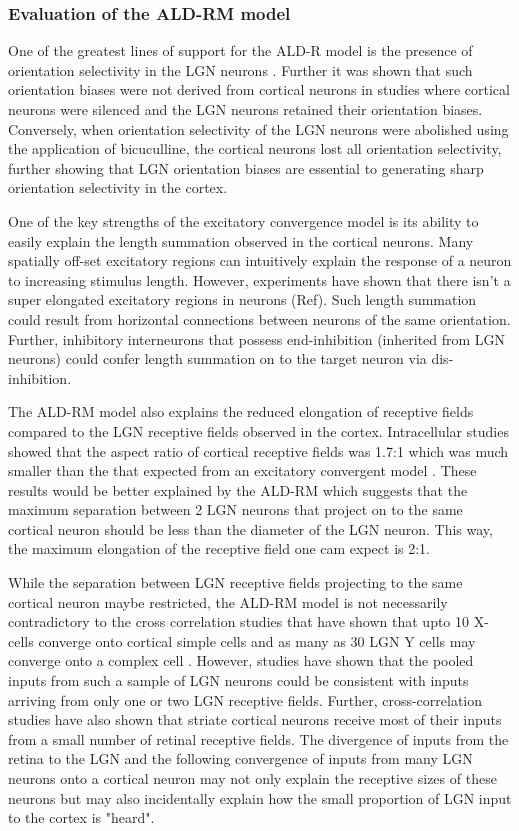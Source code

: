 \subsubsection{Evaluation of the ALD-RM model}

One of the greatest lines of support for the ALD-R model is the presence of orientation selectivity in the LGN neurons \cite{Vidyasagar1982}. Further it was shown that such orientation biases were not derived from cortical neurons in studies where cortical neurons were silenced and the LGN neurons retained their orientation biases. Conversely, when orientation selectivity of the LGN neurons were abolished using the application of bicuculline, the cortical neurons lost all orientation selectivity, further showing that LGN orientation biases are essential to generating sharp orientation selectivity in the cortex.

One of the key strengths of the excitatory convergence model is its ability to easily explain the length summation observed in the cortical neurons. Many spatially off-set excitatory regions can intuitively explain the response of a neuron to increasing stimulus length. However, experiments have shown that there isn't a super elongated excitatory regions in neurons (Ref). Such length summation could result from horizontal connections between neurons of the same orientation. Further, inhibitory interneurons that possess end-inhibition (inherited from LGN neurons) could confer length summation on to the target neuron via dis-inhibition.

The ALD-RM model also explains the reduced elongation of receptive fields compared to the LGN receptive fields observed in the cortex. Intracellular studies showed that the aspect ratio of cortical receptive fields was 1.7:1 which was much smaller than the that expected from an excitatory convergent model \cite{Pei1994}. These results would be better explained by the ALD-RM which suggests that the maximum separation between 2 LGN neurons that project on to the same cortical neuron should be less than the diameter of the LGN neuron. This way, the maximum elongation of the receptive field one cam expect is 2:1. 

While the separation between LGN receptive fields projecting to the same cortical neuron maybe restricted, the ALD-RM model is not necessarily contradictory to the cross correlation studies that have shown that upto 10 X-cells converge onto cortical simple cells and as many as 30 LGN Y cells may converge onto a complex cell \cite{Tanaka1983}. However, studies have shown that the pooled inputs from such a sample of LGN neurons could be consistent with inputs arriving from only one or two LGN receptive fields. Further, cross-correlation studies have also shown that striate cortical neurons receive most of their inputs from a small number of retinal receptive fields. The divergence of inputs from the retina to the LGN and the following convergence of inputs from many LGN neurons onto a cortical neuron may not only explain the receptive sizes of these neurons but may also incidentally explain how the small proportion of LGN input to the cortex is "heard".

